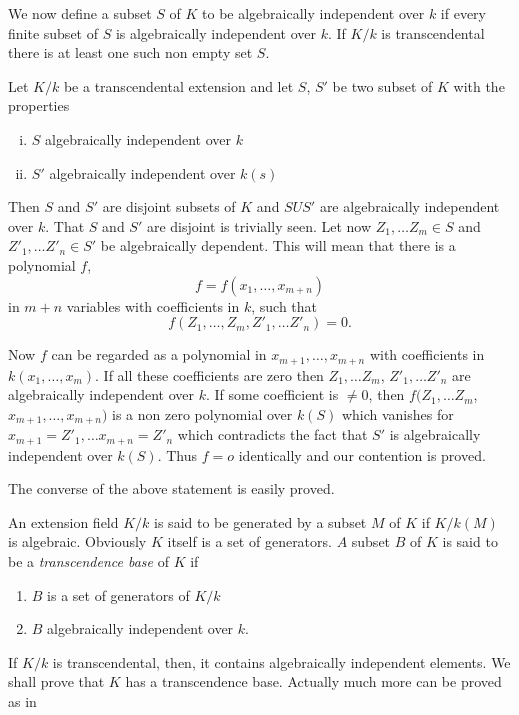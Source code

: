 We now define a subset $S$ of $K$  to be algebraically independent
over $k$ if every finite subset of $S$ is algebraically independent
over $k$. If $ K/k $  is transcendental there  is at least one  such
non empty set $S$. 

Let $ K/k $ be a transcendental extension and let $S$, $S'$ be two
subset of $K$  with the properties  
\begin{enumerate}[i)]
\item  $S$  algebraically independent over $k$
\item $S'$ algebraically independent over $k (s) $
\end{enumerate}

Then $S$ and $S'$  are disjoint subsets  of $K$ and  $ S U S'$  are
algebraically independent over $k$. That $S$ and $S'$  are disjoint is
trivially seen. Let now $ Z_1, \ldots Z_m \in S$ and $ Z'_1, \ldots
Z'_n \in S' $  be algebraically dependent. This will mean that there
is a polynomial $f$, 
$$
f = f ( x_1, \ldots , x_{m + n } )
$$
in $m +n$  variables with coefficients  in $k$, such that  
$$
f( Z_1,\ldots, Z_m, Z'_1 , \ldots  Z'_n ) = 0.
$$

Now $f$ can be regarded as a polynomial in $x_{m+1} , \ldots , x_{m +
  n} $ with coefficients in $k ( x_1, \ldots , x_m ) $. If all these
coefficients are zero then $ Z_1 ,\ldots Z_m$, $Z'_1, \ldots Z'_n  $
are algebraically independent over $k$.  If  some coefficient is $
\neq 0$, then $f(Z_1, \ldots Z_m $, $ x_{m+1}, \ldots , x_{m + n})$
is a non zero polynomial over $k (S)$ which vanishes for $x_{m+1} =
Z'_1, \ldots x_{m+n} = Z'_n $  which contradicts the fact that $S'$ is
algebraically independent over $k (S)$. Thus $ f = o $  identically
and our contention is proved.\pageoriginale 
 
The converse of the above statement is easily proved. 

An extension field  $K / k $ is said to be generated  by a subset
$M$ of $K$  if  $ K/ k (M) $ is algebraic. Obviously $K$ itself  is a
set of  generators. $A$ subset $B$ of $K$  is said to be a
\textit{transcendence base} of $K$ if 
\begin{enumerate}[1)]
\item $B$ is a set of generators of $ K / k$
\item $B$  algebraically independent over $k$.
\end{enumerate}

If $ K /k $ is transcendental, then, it contains algebraically
independent elements. We shall prove that $K$  has  a transcendence
base. Actually much more can be proved as in  

